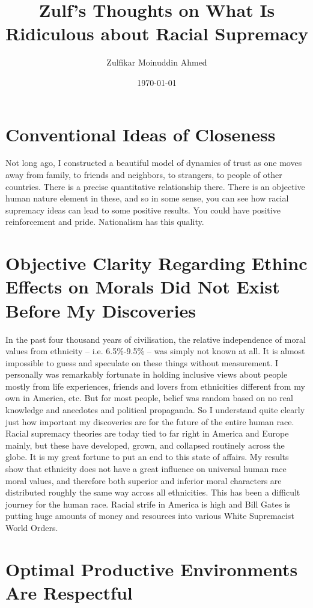 \documentclass{amsart}
\title{Zulf's Thoughts on What Is Ridiculous about Racial Supremacy}
\author{Zulfikar Moinuddin Ahmed}
\date{\today}
\begin{document}
\maketitle

\section{Conventional Ideas of Closeness}

Not long ago, I constructed a beautiful model of dynamics of trust as one moves away from family, to friends and neighbors, to strangers, to people of other countries.  There is a precise quantitative relationship there.  There is an objective human nature element in these, and so in some sense, you can see how racial supremacy ideas can lead to some positive results.  You could have positive reinforcement and pride.  Nationalism has this quality.  

\section{Objective Clarity Regarding Ethinc Effects on Morals Did Not Exist Before My Discoveries}

In the past four thousand years of civilisation, the relative independence of moral values from ethnicity -- i.e. 6.5\%-9.5\% -- was simply not known at all.  It is almost impossible to guess and speculate on these things without measurement.  I personally was remarkably fortunate in holding inclusive views about people mostly from life experiences, friends and lovers from ethnicities different from my own in America, etc.  But for most people, belief was random based on no real knowledge and anecdotes and political propaganda.  So I understand quite clearly just how important my discoveries are for the future of the entire human race.  Racial supremacy theories are today tied to far right in America and Europe mainly, but these have developed, grown, and collapsed routinely across the globe.  It is my great fortune to put an end to this state of affairs.  My results show that ethnicity does not have a great influence on universal human race moral values, and therefore both superior and inferior moral characters are distributed roughly the same way across all ethnicities.  This has been a difficult journey for the human race.  Racial strife in America is high and Bill Gates is putting huge amounts of money and resources into various White Supremacist World Orders.  

\section{Optimal Productive Environments Are Respectful}
\end{document}
